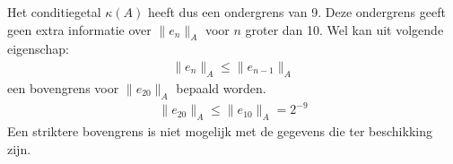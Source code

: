 \documentclass[a4paper, 12pt, titlepage, fleqn]{article}
\begin{document}
 
Het conditiegetal $\kappa(A)$ heeft dus een ondergrens van 9. Deze ondergrens geeft geen extra informatie over $\|e_n\|_A$ voor $n$ groter dan 10. Wel kan uit volgende eigenschap:
\begin{align*}
\|e_n\|_A \leq \|e_{n-1}\|_A
\end{align*}
een bovengrens voor $\|e_{20}\|_A$ bepaald worden. 
\begin{align*}
\|e_{20}\|_A \leq \|e_{10}\|_A = 2^{-9}
\end{align*}
Een striktere bovengrens is niet mogelijk met de gegevens die ter beschikking zijn.
\end{document}
